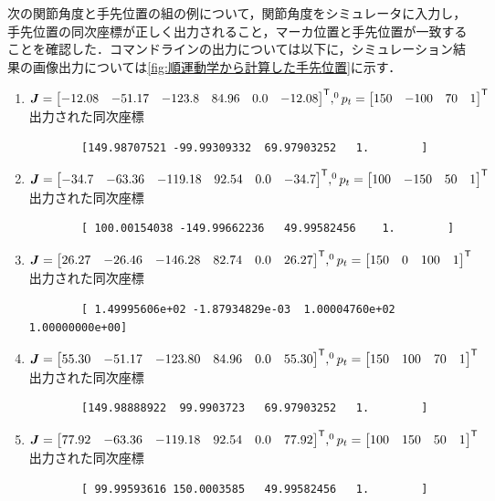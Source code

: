 \documentclass{ltjsarticle}
\begin{document}
次の関節角度と手先位置の組の例について，関節角度をシミュレータに入力し，手先位置の同次座標が正しく出力されること，マーカ位置と手先位置が一致することを確認した．コマンドラインの出力については以下に，シミュレーション結果の画像出力については\cref{fig:順運動学から計算した手先位置}に示す．
\begin{enumerate}[label=(\alph*)]
	\item $\bm{J} = \mqty[-12.08 & -51.17 & -123.8 & 84.96 & 0.0 & -12.08]^\mathsf{T}, ^0p_t = \mqty[150 & -100 & 70 & 1]^\mathsf{T}$ \\ 
	出力された同次座標
	\begin{lstlisting}
		[149.98707521 -99.99309332  69.97903252   1.        ]
	\end{lstlisting}
	\item $\bm{J} = \mqty[-34.7 & -63.36 & -119.18 & 92.54 & 0.0 & -34.7]^\mathsf{T}, ^0p_t = \mqty[100 & -150 & 50 & 1]^\mathsf{T}$ \\
	出力された同次座標
	\begin{lstlisting}
		[ 100.00154038 -149.99662236   49.99582456    1.        ]
	\end{lstlisting}
	\item $\bm{J} = \mqty[26.27 & -26.46 & -146.28 & 82.74 & 0.0 & 26.27]^\mathsf{T}, ^0p_t = \mqty[150 & 0 & 100 & 1]^\mathsf{T}$ \\
	出力された同次座標
	\begin{lstlisting}
		[ 1.49995606e+02 -1.87934829e-03  1.00004760e+02  1.00000000e+00]
	\end{lstlisting}
	\item $\bm{J} = \mqty[55.30 & -51.17 & -123.80 & 84.96 & 0.0 & 55.30]^\mathsf{T}, ^0p_t = \mqty[150 & 100 & 70 & 1]^\mathsf{T}$ \\
	出力された同次座標
	\begin{lstlisting}
		[149.98888922  99.9903723   69.97903252   1.        ]
	\end{lstlisting}
	\item $\bm{J} = \mqty[77.92 & -63.36 & -119.18 & 92.54 & 0.0 & 77.92]^\mathsf{T}, ^0p_t = \mqty[100 & 150 & 50 & 1]^\mathsf{T}$ \\
	出力された同次座標
	\begin{lstlisting}
		[ 99.99593616 150.0003585   49.99582456   1.        ]
	\end{lstlisting}
\end{enumerate}
\end{document}

